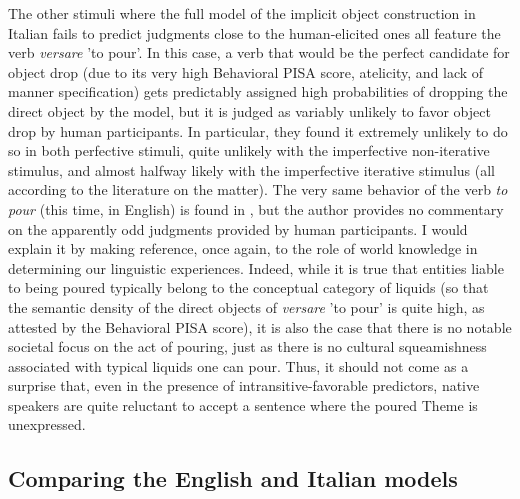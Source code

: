 The other stimuli where the full model of the implicit object construction in Italian fails to predict judgments close to the human-elicited ones all feature the verb \textit{versare} 'to pour'. In this case, a verb that would be the perfect candidate for object drop (due to its very high Behavioral PISA score, atelicity, and lack of manner specification) gets predictably assigned high probabilities of dropping the direct object by the model, but it is judged as variably unlikely to favor object drop by human participants. In particular, they found it extremely unlikely to do so in both perfective stimuli, quite unlikely with the imperfective non-iterative stimulus, and almost halfway likely with the imperfective iterative stimulus (all according to the literature on the matter). The very same behavior of the verb \textit{to pour} (this time, in English) is found in \textcite[148]{Medina2007}, but the author provides no commentary on the apparently odd judgments provided by human participants. I would explain it by making reference, once again, to the role of world knowledge in determining our linguistic experiences. Indeed, while it is true that entities liable to being poured typically belong to the conceptual category of liquids (so that the semantic density of the direct objects of \textit{versare} 'to pour' is quite high, as attested by the Behavioral PISA score), it is also the case that there is no notable societal focus on the act of pouring, just as there is no cultural squeamishness associated with typical liquids one can pour. Thus, it should not come as a surprise that, even in the presence of intransitive-favorable predictors, native speakers are quite reluctant to accept a sentence where the poured Theme is unexpressed.


\subsection{Comparing the English and Italian models} 

